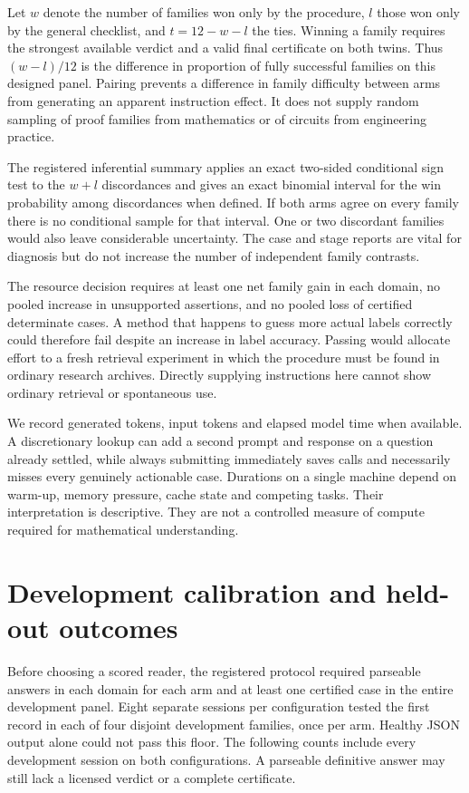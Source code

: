 \documentclass[12pt,letterpaper]{article}
\begin{document}
Let $w$ denote the number of families won only by the procedure, $l$ those won only by the general checklist, and $t=12-w-l$ the ties. Winning a family requires the strongest available verdict and a valid final certificate on both twins. Thus $(w-l)/12$ is the difference in proportion of fully successful families on this designed panel. Pairing prevents a difference in family difficulty between arms from generating an apparent instruction effect. It does not supply random sampling of proof families from mathematics or of circuits from engineering practice.

The registered inferential summary applies an exact two-sided conditional sign test to the $w+l$ discordances and gives an exact binomial interval for the win probability among discordances when defined. If both arms agree on every family there is no conditional sample for that interval. One or two discordant families would also leave considerable uncertainty. The case and stage reports are vital for diagnosis but do not increase the number of independent family contrasts.

The resource decision requires at least one net family gain in each domain, no pooled increase in unsupported assertions, and no pooled loss of certified determinate cases. A method that happens to guess more actual labels correctly could therefore fail despite an increase in label accuracy. Passing would allocate effort to a fresh retrieval experiment in which the procedure must be found in ordinary research archives. Directly supplying instructions here cannot show ordinary retrieval or spontaneous use.

We record generated tokens, input tokens and elapsed model time when available. A discretionary lookup can add a second prompt and response on a question already settled, while always submitting immediately saves calls and necessarily misses every genuinely actionable case. Durations on a single machine depend on warm-up, memory pressure, cache state and competing tasks. Their interpretation is descriptive. They are not a controlled measure of compute required for mathematical understanding.

\section{Development calibration and held-out outcomes}

Before choosing a scored reader, the registered protocol required parseable answers in each domain for each arm and at least one certified case in the entire development panel. Eight separate sessions per configuration tested the first record in each of four disjoint development families, once per arm. Healthy JSON output alone could not pass this floor. The following counts include every development session on both configurations. A parseable definitive answer may still lack a licensed verdict or a complete certificate.
\end{document}

